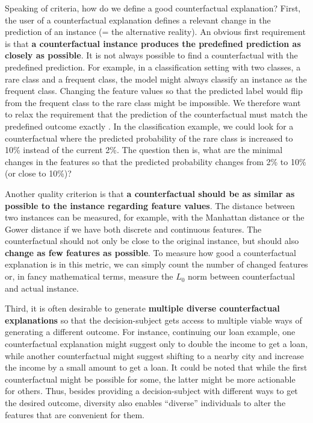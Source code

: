 \documentclass[
  10pt,
]{scrbook}
\begin{document}
Speaking of criteria, how do we define a good counterfactual explanation?
First, the user of a counterfactual explanation defines a relevant change in the prediction of an instance (= the alternative reality).
An obvious first requirement is that \textbf{a counterfactual instance produces the predefined prediction as closely as possible}.
It is not always possible to find a counterfactual with the predefined prediction.
For example, in a classification setting with two classes, a rare class and a frequent class, the model might always classify an instance as the frequent class.
Changing the feature values so that the predicted label would flip from the frequent class to the rare class might be impossible.
We therefore want to relax the requirement that the prediction of the counterfactual must match the predefined outcome exactly .
In the classification example, we could look for a counterfactual where the predicted probability of the rare class is increased to 10\% instead of the current 2\%.
The question then is, what are the minimal changes in the features so that the predicted probability changes from 2\% to 10\% (or close to 10\%)?

Another quality criterion is that \textbf{a counterfactual should be as similar as possible to the instance regarding feature values}.
The distance between two instances can be measured, for example, with the Manhattan distance or the Gower distance if we have both discrete and continuous features.
The counterfactual should not only be close to the original instance, but should also \textbf{change as few features as possible}.
To measure how good a counterfactual explanation is in this metric, we can simply count the number of changed features or, in fancy mathematical terms, measure the \(L_0\) norm between counterfactual and actual instance.

Third, it is often desirable to generate \textbf{multiple diverse counterfactual explanations} so that the decision-subject gets access to multiple viable ways of generating a different outcome.
For instance, continuing our loan example, one counterfactual explanation might suggest only to double the income to get a loan, while another counterfactual might suggest shifting to a nearby city and increase the income by a small amount to get a loan.
It could be noted that while the first counterfactual might be possible for some, the latter might be more actionable for others.
Thus, besides providing a decision-subject with different ways to get the desired outcome, diversity also enables ``diverse'' individuals to alter the features that are convenient for them.
\end{document}
